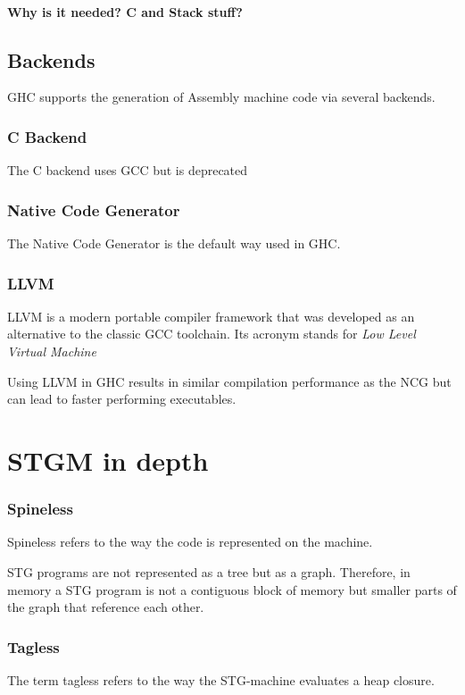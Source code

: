 \documentclass[runningheads]{llncs}
\begin{document}
\paragraph{Why is it needed? C and Stack stuff?}


\subsection{Backends}
GHC supports the generation of Assembly machine code via several backends.


\subsubsection{C Backend}
The C backend uses GCC but is deprecated

\subsubsection{Native Code Generator}
The Native Code Generator is the default way used in GHC.

\subsubsection{LLVM}
LLVM is a modern portable compiler framework that was developed as an alternative to the classic GCC toolchain. Its acronym stands for \textit{Low Level Virtual Machine} \cite{lattner2004llvm}

Using LLVM in GHC results in similar compilation performance as the NCG but can lead to faster performing executables.

\section{STGM in depth}
\label{sec:stgm}

\cite{jones1992implementing}


\subsubsection{Spineless}
Spineless refers to the way the code is represented on the machine.

STG programs are not represented as a tree but as a graph. Therefore, in memory a STG program is not a contiguous block of memory but smaller parts of the graph that reference each other.

\subsubsection{Tagless}
The term tagless refers to the way the STG-machine evaluates a heap closure. 
\end{document}
